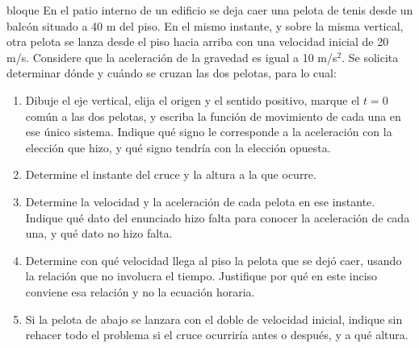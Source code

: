\documentclass[11pt,openany]{book}
\begin{document}
\begin{ejercicio}{bloque}
En el patio interno de un edificio se deja caer una pelota de tenis desde un balcón situado a 40 m del piso. En el mismo instante, y sobre la misma vertical, otra pelota se lanza desde el piso hacia arriba con una velocidad inicial de 20 m/s. Considere que la aceleración de la gravedad es igual a 10 m/s$^2$. Se solicita determinar dónde y cuándo se cruzan las dos pelotas, para lo cual:
\begin{enumerate}[label=(\alph*), leftmargin=1.7em, itemsep=1pt, topsep=3pt]
  \item Dibuje el eje vertical, elija el origen y el sentido positivo, marque el $t = 0$ común a las dos pelotas, y escriba la función de movimiento de cada una en ese único sistema. Indique qué signo le corresponde a la aceleración con la elección que hizo, y qué signo tendría con la elección opuesta.
  \item Determine el instante del cruce y la altura a la que ocurre.
  \item Determine la velocidad y la aceleración de cada pelota en ese instante. Indique qué dato del enunciado hizo falta para conocer la aceleración de cada una, y qué dato no hizo falta.
  \item Determine con qué velocidad llega al piso la pelota que se dejó caer, usando la relación que no involucra el tiempo. Justifique por qué en este inciso conviene esa relación y no la ecuación horaria.
  \item Si la pelota de abajo se lanzara con el doble de velocidad inicial, indique sin rehacer todo el problema si el cruce ocurriría antes o después, y a qué altura.
\end{enumerate}
\end{ejercicio}
\end{document}
